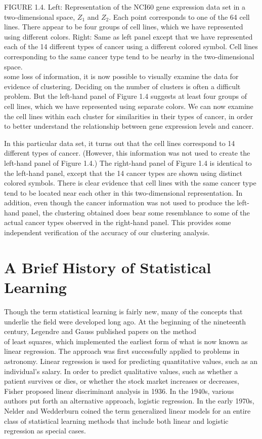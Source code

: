\documentclass[10pt]{article}
\begin{document}
FIGURE 1.4. Left: Representation of the NCI60 gene expression data set in a two-dimensional space, $Z_{1}$ and $Z_{2}$. Each point corresponds to one of the 64 cell lines. There appear to be four groups of cell lines, which we have represented using different colors. Right: Same as left panel except that we have represented each of the 14 different types of cancer using a different colored symbol. Cell lines corresponding to the same cancer type tend to be nearby in the two-dimensional space.\\
some loss of information, it is now possible to visually examine the data for evidence of clustering. Deciding on the number of clusters is often a difficult problem. But the left-hand panel of Figure 1.4 suggests at least four groups of cell lines, which we have represented using separate colors. We can now examine the cell lines within each cluster for similarities in their types of cancer, in order to better understand the relationship between gene expression levels and cancer.

In this particular data set, it turns out that the cell lines correspond to 14 different types of cancer. (However, this information was not used to create the left-hand panel of Figure 1.4.) The right-hand panel of Figure 1.4 is identical to the left-hand panel, except that the 14 cancer types are shown using distinct colored symbols. There is clear evidence that cell lines with the same cancer type tend to be located near each other in this two-dimensional representation. In addition, even though the cancer information was not used to produce the left-hand panel, the clustering obtained does bear some resemblance to some of the actual cancer types observed in the right-hand panel. This provides some independent verification of the accuracy of our clustering analysis.

\section*{A Brief History of Statistical Learning}
Though the term statistical learning is fairly new, many of the concepts that underlie the field were developed long ago. At the beginning of the nineteenth century, Legendre and Gauss published papers on the method\\
of least squares, which implemented the earliest form of what is now known as linear regression. The approach was first successfully applied to problems in astronomy. Linear regression is used for predicting quantitative values, such as an individual's salary. In order to predict qualitative values, such as whether a patient survives or dies, or whether the stock market increases or decreases, Fisher proposed linear discriminant analysis in 1936. In the 1940s, various authors put forth an alternative approach, logistic regression. In the early 1970s, Nelder and Wedderburn coined the term generalized linear models for an entire class of statistical learning methods that include both linear and logistic regression as special cases.
\end{document}
